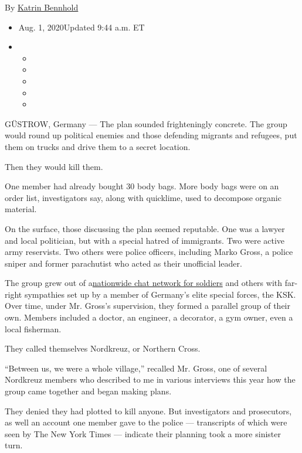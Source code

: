 By \href{https://www.nytimes3xbfgragh.onion/by/katrin-bennhold}{Katrin
Bennhold}

\begin{itemize}
\item
  Aug. 1, 2020Updated 9:44 a.m. ET
\item
  \begin{itemize}
  \item
  \item
  \item
  \item
  \item
  \end{itemize}
\end{itemize}

GÜSTROW, Germany --- The plan sounded frighteningly concrete. The group
would round up political enemies and those defending migrants and
refugees, put them on trucks and drive them to a secret location.

Then they would kill them.

One member had already bought 30 body bags. More body bags were on an
order list, investigators say, along with quicklime, used to decompose
organic material.

On the surface, those discussing the plan seemed reputable. One was a
lawyer and local politician, but with a special hatred of immigrants.
Two were active army reservists. Two others were police officers,
including Marko Gross, a police sniper and former parachutist who acted
as their unofficial leader.

The group grew out of
a\href{https://www.nytimes3xbfgragh.onion/2020/07/03/world/europe/germany-military-neo-nazis-ksk.html?searchResultPosition=2}{nationwide
chat network for soldiers} and others with far-right sympathies set up
by a member of Germany's elite special forces, the KSK. Over time, under
Mr. Gross's supervision, they formed a parallel group of their own.
Members included a doctor, an engineer, a decorator, a gym owner, even a
local fisherman.

They called themselves Nordkreuz, or Northern Cross.

``Between us, we were a whole village,'' recalled Mr. Gross, one of
several Nordkreuz members who described to me in various interviews this
year how the group came together and began making plans.

They denied they had plotted to kill anyone. But investigators and
prosecutors, as well an account one member gave to the police ---
transcripts of which were seen by The New York Times --- indicate their
planning took a more sinister turn.

